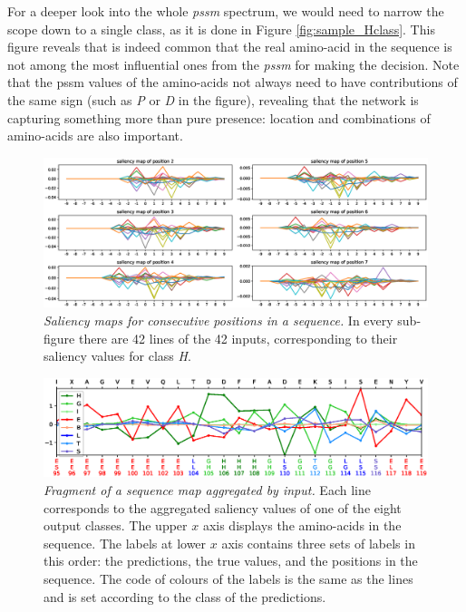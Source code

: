 	For a deeper look into the whole \textit{pssm} spectrum, we would need to narrow the scope down to a single class, as it is done in Figure \ref{fig:sample_Hclass}. This figure reveals that is indeed common that the real amino-acid in the sequence is not among the most influential ones from the \textit{pssm} for making the decision. Note that the pssm values of the amino-acids not always need to have contributions of the same sign (such as \textit{P} or \textit{D} in the figure), revealing that the network is capturing something more than pure presence: location and combinations of amino-acids are also important.
	
	\begin{figure}
	\centering
	\includegraphics[width=1\linewidth]{Figures/sliding}
	\caption{\textit{Saliency maps for consecutive positions in a sequence.} In every sub-figure there are 42 lines of the 42 inputs, corresponding to their saliency values for class \textit{H}.}
	\label{fig:sliding}
	\end{figure}

	
	\begin{figure}
	\centering
	\includegraphics[width=1\linewidth]{Figures/sample_8classes}
	\caption{\textit{Fragment of a sequence map aggregated by input.} Each line corresponds to the aggregated saliency values of one of the eight output classes. The upper $x$ axis displays the amino-acids in the sequence. The labels at lower $x$ axis contains three sets of labels in this order: the predictions, the true values, and the positions in the sequence. The code of colours of the labels is the same as the lines and is set according to the class of the predictions.}
	\label{fig:sample_8classes}
	\end{figure}
	
